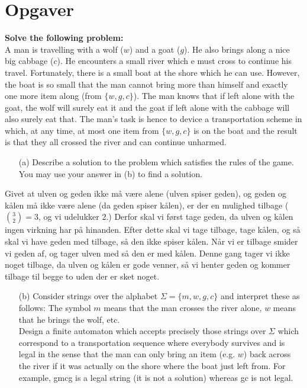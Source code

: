 \newpage
\section{Opgaver}

\noindent
\textbf{Solve the following problem:} \\
\noindent
A man is travelling with a wolf ($w$) and a goat ($g$). He also brings along a nice big cabbage ($c$). He encounters a small river which e must cross to continue his travel. Fortunately, there is a small boat at the shore which he can use. However, the boat is so small that the man cannot bring more than himself and exactly one more item along (from $\{w, g, c\}$). The man knows that if left alone with the goat, the wolf will surely eat it and the goat if left alone with the cabbage will also surely eat that. The man's task is hence to device a transportation scheme in which, at any time, at most one item from $\{w,g,c\}$ is on the boat and the result is that they all crossed the river and can continue unharmed.

\begin{enumerate}
  \item[(a)] Describe a solution to the problem which satisfies the rules of the game. You may use your answer in (b) to find a solution.
\end{enumerate}

Givet at ulven og geden ikke må være alene (ulven spiser geden), og geden og kålen må ikke være alene (da geden spiser kålen), er der en mulighed tilbage ($\binom{3}{2} = 3$, og vi udelukker 2.) Derfor skal vi først tage geden, da ulven og kålen ingen virkning har på hinanden. Efter dette skal vi tage tilbage, tage kålen, og så skal vi have geden med tilbage, så den ikke spiser kålen. Når vi er tilbage smider vi geden af, og tager ulven med så den er med kålen. Denne gang tager vi ikke noget tilbage, da ulven og kålen er gode venner, så vi henter geden og kommer tilbage til begge to uden der er sket noget.

\begin{enumerate}
\item [(b)] Consider strings over the alphabet $\Sigma = \{m, w, g, c\}$ and interpret these as follows: The symbol $m$ means that the man crosses the river alone, $w$ means that he brings the wolf, etc. \\ Design a finite automaton which accepts precisely those strings over $\Sigma$ which correspond to a transportation sequence where everybody survives and is legal in the sense that the man can only bring an item (e.g. $w$) back across the river if it was actually on the shore where the boat just left from. For example, gmcg is a legal string (it is not a solution) whereas gc is not legal.
\end{enumerate}

